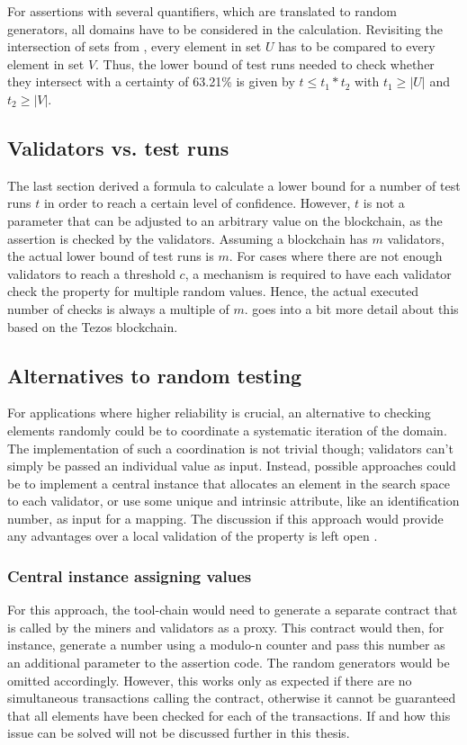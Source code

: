 For assertions with several quantifiers, which are translated to random generators, all domains have to be considered in the calculation. Revisiting the intersection of sets from , every element in set $U$ has to be compared to every element in set $V$. Thus, the lower bound of test runs needed to check whether they intersect with a certainty of 63.21\% is given by $t \leq t_1 * t_2$ with $t_1 \geq |U|$ and $t_2 \geq |V|$.

\subsection{Validators vs. test runs}
The last section derived a formula to calculate a lower bound for a number of test runs $t$ in order to reach a certain level of confidence. However, $t$ is not a parameter that can be adjusted to an arbitrary value on the blockchain, as the assertion is checked by the validators. Assuming a blockchain has $m$ validators, the actual lower bound of test runs is $m$. For cases where there are not enough validators to reach a threshold $c$, a mechanism is required to have each validator check the property for multiple random values. Hence, the actual executed number of checks is always a multiple of $m$. \secref{} goes into a bit more detail about this based on the Tezos blockchain. 

\subsection{Alternatives to random testing}
For applications where higher reliability is crucial, an alternative to checking elements randomly could be to coordinate a systematic iteration of the domain. The implementation of such a coordination is not trivial though; validators can't simply be passed an individual value as input. Instead, possible approaches could be to implement a central instance that allocates an element in the search space to each validator, or use some unique and intrinsic attribute, like an identification number, as input for a mapping. The discussion if this approach would provide any advantages over a local validation of the property is left open .

\subsubsection{Central instance assigning values}
For this approach, the tool-chain would need to generate a separate contract that is called by the miners and validators as a proxy. This contract would then, for instance, generate a number using a modulo-n counter and pass this number as an additional parameter to the assertion code. The random generators would be omitted accordingly. However, this works only as expected if there are no simultaneous transactions calling the contract, otherwise it cannot be guaranteed that all elements have been checked for each of the transactions. If and how this issue can be solved will not be discussed further in this thesis.

